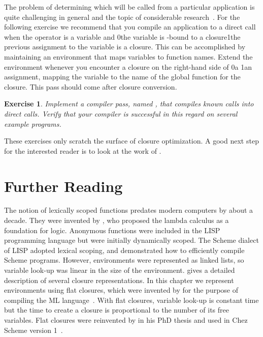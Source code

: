 \documentclass[7x10]{TimesAPriori_MIT}%
\def\racketEd{0}
\def\pythonEd{1}
\def\edition{1}
\newcommand{\racket}[1]{{\if\edition\racketEd{#1}\fi}}
\newcommand{\pythonColor}[0]{}
\newcommand{\python}[1]{{\if\edition\pythonEd\pythonColor #1\fi}}
\newtheorem{exercise}[theorem]{Exercise}
\numberwithin{theorem}{chapter}
\numberwithin{definition}{chapter}
\numberwithin{equation}{chapter}
\begin{document}
The problem of determining which  will be called from a
particular application is quite challenging in general and the topic
of considerable research~\citep{Shivers:1988aa,Gilray:2016aa}. For the
following exercise we recommend that you compile an application to a
direct call when the operator is a variable and \racket{the variable
  is -bound to a closure}\python{the previous assignment to
  the variable is a closure}.  This can be accomplished by maintaining
an environment that maps variables to function names.  Extend the
environment whenever you encounter a closure on the right-hand side of
\racket{a }\python{an assignment}, mapping the variable to the
name of the global function for the closure. This pass should come
after closure conversion.

\begin{exercise}\normalfont\normalsize
Implement a compiler pass, named , that
compiles known calls into direct calls. Verify that your compiler is
successful in this regard on several example programs.
\end{exercise}

These exercises only scratch the surface of closure optimization. A
good next step for the interested reader is to look at the work of
\citet{Keep:2012ab}.

\section{Further Reading}

The notion of lexically scoped functions predates modern computers by
about a decade. They were invented by \citet{Church:1932aa}, who
proposed the lambda calculus as a foundation for logic. Anonymous
functions were included in the LISP~\citep{McCarthy:1960dz}
programming language but were initially dynamically scoped. The Scheme
dialect of LISP adopted lexical scoping, and
\citet{Guy-L.-Steele:1978yq} demonstrated how to efficiently compile
Scheme programs. However, environments were represented as linked
lists, so variable look-up was linear in the size of the
environment. \citet{Appel91} gives a detailed description of several
closure representations. In this chapter we represent environments
using flat closures, which were invented by
\citet{Cardelli:1983aa,Cardelli:1984aa} for the purpose of compiling
the ML language~\citep{Gordon:1978aa,Milner:1990fk}.  With flat
closures, variable look-up is constant time but the time to create a
closure is proportional to the number of its free variables.  Flat
closures were reinvented by \citet{Dybvig:1987ab} in his PhD thesis
and used in Chez Scheme version 1~\citep{Dybvig:2006aa}.
\end{document}
